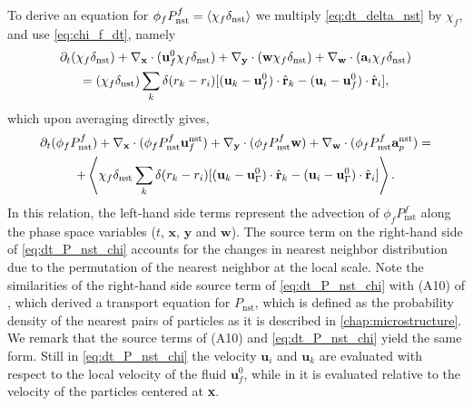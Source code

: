 To derive an equation for $\phi_f P_\text{nst}^f = \left<\chi_f \delta_\text{nst}\right>$ we multiply \ref{eq:dt_delta_nst} by $\chi_f$, and use \ref{eq:chi_f_dt}, namely
\begin{multline}
    \pddt (\chi_f\delta_\text{nst})
    +  \pddx \cdot (\textbf{u}_f^0 \chi_f\delta_\text{nst})
    +  \pddy \cdot (\textbf{w}    \chi_f\delta_\text{nst})
    +  \pddw \cdot   (\textbf{a}_i  \chi_f\delta_\text{nst})\\
    = 
    (\chi_f\delta_\text{nst})
    \sum_k 
    \delta(r_k - r_i)
    [(\textbf{u}_k - \textbf{u}_f^0) \cdot \hat{\textbf{r}}_k - (\textbf{u}_i  - \textbf{u}_f^0)\cdot \hat{\textbf{r}}_i],
    \label{eq:dt_delta_nst_chi}
\end{multline}
which upon averaging directly gives,
\begin{multline}
    \pddt (\phi_fP_\text{nst}^f)
    + 
    \pddx \cdot (
        \phi_f 
        P_\text{nst}^f
        \textbf{u}_f^\text{nst}
    )
    + \pddy \cdot (
        \phi_f
        P_\text{nst}^f
        \textbf{w} 
    )
    +
    \pddw \cdot (  
        \phi_f 
        P_\text{nst}^f
        \textbf{a}_p^\text{nst} 
    )
    = \\
    + \avg{
     \chi_f \delta_\text{nst}
    \sum_k 
    \delta(r_k - r_i)
    [(\textbf{u}_k - \textbf{u}_\Gamma^0) \cdot \hat{\textbf{r}}_k - (\textbf{u}_i- \textbf{u}_\Gamma^0)  \cdot \hat{\textbf{r}}_i]}.
    \label{eq:dt_P_nst_chi}
\end{multline}
In this relation, the left-hand side terms represent the advection of $\phi_f P_\text{nst}^f$ along the phase space variables ($t$, $\textbf{x}$, $\textbf{y}$ and $\textbf{w}$).
The source term on the right-hand side of \ref{eq:dt_P_nst_chi} accounts for the changes in nearest neighbor distribution due to the permutation of the nearest neighbor at the local scale. 
Note the similarities of the right-hand side source term of \ref{eq:dt_P_nst_chi} with (A10) of \citet{zhang2023evolution}, which derived a transport equation for $P_\text{nst}$, which is defined as the probability density of the nearest pairs of particles as it is described in \ref{chap:microstructure}. 
We remark that the source terms of (A10) \citet{zhang2023evolution} and \ref{eq:dt_P_nst_chi} yield the same form.
Still in \ref{eq:dt_P_nst_chi} the velocity $\textbf{u}_i$ and $\textbf{u}_k$ are evaluated with respect to the local velocity of the fluid $\textbf{u}_f^0$, while in \citet{zhang2023evolution} it is evaluated relative to the velocity of the particles centered at \textbf{x}. 


